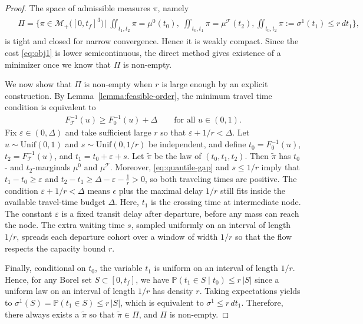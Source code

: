 \documentclass[11pt]{article}
\newcommand{\calT}{{\mathcal T}}
\begin{document}
\begin{proof}
The space of admissible measures $\pi$, namely
\begin{align}
\begin{aligned}
&\Pi = \bigg\{\pi \in \mathcal{M}_+\big([0, t_f]^3\big) \Big | \; \iint_{t_1, t_2} \!\!\!\!\!\! \pi = \mu^0(t_0),\ \iint_{t_0, t_1} \!\!\!\!\!\! \pi = \mu^\calT(t_2), \iint_{t_0, t_2} \!\!\!\!\!\! \pi:= \sigma^1(t_1) \leq r \, dt_1 \bigg\},  
\end{aligned}
\end{align}
is tight and closed for narrow convergence. Hence it is weakly compact. Since the cost \eqref{eq:obj1} is lower semicontinuous, the direct method gives existence of a minimizer once we know that $\Pi$ is non-empty.


We now show that $\Pi$ is non-empty when $r$ is large enough by an explicit construction.
By Lemma~\ref{lemma:feasible-order}, the minimum travel time condition is equivalent to
\begin{align}\label{eq:quantile-gap}
F_{\calT}^{-1}(u)\ge F_0^{-1}(u)+\Delta
\qquad
\text{for all }u\in(0,1).
\end{align}
Fix $\varepsilon\in(0,\Delta)$ and take sufficient large $r$ so that $\varepsilon+1/r<\Delta$.
Let $u\sim \mathrm{Unif}(0,1)$ and $s\sim \mathrm{Unif}(0,1/r)$ be independent, and define
$t_0 = F_0^{-1}(u)$,  $t_2 = F_{\calT}^{-1}(u)$, and $t_1 = t_0+\varepsilon+s$. Let $\tilde\pi$ be the law of $(t_0,t_1,t_2)$.
Then $\tilde\pi$ has $t_0$- and $t_2$-marginals $\mu^0$ and $\mu^{\calT}$. Moreover, \eqref{eq:quantile-gap} and $s\le 1/r$ imply that $t_1-t_0\ge \varepsilon$ and $t_2-t_1 \ge \Delta-\varepsilon-\frac{1}{r} > 0$, so both traveling times are positive. The condition $\varepsilon+1/r<\Delta$ means $\epsilon$ plus the maximal delay $1/r$ still fits inside the available travel-time budget $\Delta$. Here, $t_1$ is the crossing time at intermediate node. The constant $\varepsilon$ is a fixed transit delay after departure, before any mass can reach the node. The extra waiting time $s$, sampled uniformly on an interval of length $1/r$, spreads each departure cohort over a window of width $1/r$ so that the flow respects the capacity bound $r$.

Finally, conditional on $t_0$, the variable $t_1$ is uniform on an interval of length $1/r$. Hence, for any Borel set $S\subset[0,t_f]$, we have $\mathbb P(t_1\in S\mid t_0)\le r\,|S|$ since a uniform law on an interval of length $1/r$ has density $r$.
Taking expectations yields to $\sigma^1(S)=\mathbb P(t_1\in S)\le r\,|S|$, which is equivalent to $\sigma^1\le r\,dt_1$. Therefore, there always exists a $\tilde\pi$ so that $\tilde\pi\in\Pi$, and $\Pi$ is non-empty.
\end{proof}
\end{document}
